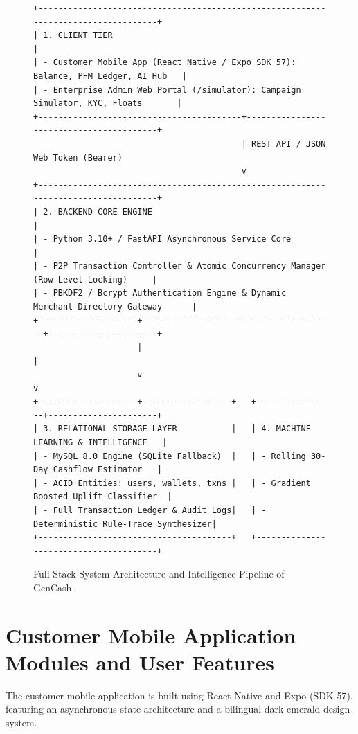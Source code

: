 \documentclass[10.5pt,a4paper]{article}
\begin{document}
\begin{figure}[htbp]
\centering
\begin{verbatim}
+-----------------------------------------------------------------------------------+
| 1. CLIENT TIER                                                                    |
| - Customer Mobile App (React Native / Expo SDK 57): Balance, PFM Ledger, AI Hub   |
| - Enterprise Admin Web Portal (/simulator): Campaign Simulator, KYC, Floats       |
+-----------------------------------------+-----------------------------------------+
                                          | REST API / JSON Web Token (Bearer)
                                          v
+-----------------------------------------------------------------------------------+
| 2. BACKEND CORE ENGINE                                                            |
| - Python 3.10+ / FastAPI Asynchronous Service Core                                |
| - P2P Transaction Controller & Atomic Concurrency Manager (Row-Level Locking)     |
| - PBKDF2 / Bcrypt Authentication Engine & Dynamic Merchant Directory Gateway      |
+--------------------+---------------------------------------+----------------------+
                     |                                       |
                     v                                       v
+--------------------+------------------+   +----------------+----------------------+
| 3. RELATIONAL STORAGE LAYER           |   | 4. MACHINE LEARNING & INTELLIGENCE   |
| - MySQL 8.0 Engine (SQLite Fallback)  |   | - Rolling 30-Day Cashflow Estimator   |
| - ACID Entities: users, wallets, txns |   | - Gradient Boosted Uplift Classifier  |
| - Full Transaction Ledger & Audit Logs|   | - Deterministic Rule-Trace Synthesizer|
+---------------------------------------+   +---------------------------------------+
\end{verbatim}
\caption{Full-Stack System Architecture and Intelligence Pipeline of GenCash.}
\label{fig:arch}
\end{figure}

\section{Customer Mobile Application Modules and User Features}

The customer mobile application is built using React Native and Expo (SDK 57), featuring an asynchronous state architecture and a bilingual dark-emerald design system.
\end{document}
